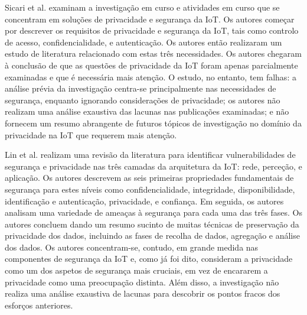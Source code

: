 \documentclass[conference]{IEEEtran}
\begin{document}
Sicari et al. \cite{sicari2015security} examinam a investigação em curso
e atividades em curso que se concentram em soluções de privacidade e segurança
da IoT. Os autores começar por descrever os requisitos de privacidade e
segurança da IoT, tais como controlo de acesso, confidencialidade, e autenticação.
Os autores então realizaram um estudo de literatura relacionado com estas
três necessidades. Os autores chegaram à conclusão de que as questões de
privacidade da IoT foram apenas parcialmente examinadas e que é necessária
mais atenção. O estudo, no entanto, tem falhas: a análise prévia da investigação
centra-se principalmente nas necessidades de segurança, enquanto ignorando
considerações de privacidade; os autores não realizam uma análise exaustiva
das lacunas nas publicações examinadas; e não fornecem um resumo abrangente
de futuros tópicos de investigação no domínio da privacidade na IoT que requerem
mais atenção.


Lin et al. \cite{LinSurvey} realizam uma revisão da literatura para identificar
vulnerabilidades de segurança e privacidade nas três camadas da arquitetura
da IoT: rede, perceção, e aplicação. Os autores descrevem as seis primeiras
propriedades fundamentais de segurança para estes níveis como confidencialidade,
integridade, disponibilidade, identificação e autenticação, privacidade,
e confiança. Em seguida, os autores analisam uma variedade de ameaças à segurança
para cada uma das três fases. Os autores concluem dando um resumo sucinto
de muitas técnicas de preservação da privacidade dos dados, incluindo as
fases de recolha de dados, agregação e análise dos dados. Os autores concentram-se,
contudo, em grande medida nas componentes de segurança da IoT e, como já
foi dito, consideram a privacidade como um dos aspetos de segurança mais
cruciais, em vez de encararem a privacidade como uma preocupação distinta.
Além disso, a investigação não realiza uma análise exaustiva de lacunas para
descobrir os pontos fracos dos esforços anteriores.
\end{document}
